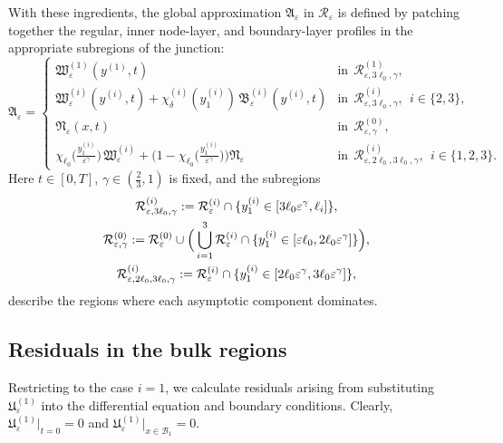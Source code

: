 \documentclass[reqno]{amsart}            %
\numberwithin{equation}{section}
\begin{document}
	With these ingredients, the global approximation $\mathfrak{A}_\varepsilon$ in $\mathcal{R}_\varepsilon$ is 
	defined by patching together the regular, inner node-layer, and boundary-layer profiles in the 
	appropriate subregions of the junction:
	\begin{equation}\label{first_app}
		\mathfrak{A}_\varepsilon =
		\left\{
		\begin{array}{ll}
			\mathfrak{W}^{(1)}_\varepsilon(y^{(1)}, t) & \text{in} \  \  \mathcal{R}^{(1)}_{\varepsilon,3\ell_0,\gamma}, 
			\\[4pt]
			\mathfrak{W}^{(i)}_\varepsilon(y^{(i)}, t) + \chi_\delta^{(i)}(y^{(i)}_1) \, \mathfrak{B}^{(i)}_\varepsilon(y^{(i)}, t)& \text{in} \ \
			\mathcal{R}^{(i)}_{\varepsilon,3\ell_0,\gamma}, \ \ i\in\{2, 3\},
			\\[4pt]
			\mathfrak{N}_\varepsilon(x,t) & \text{in} \ \  \mathcal{R}^{(0)}_{\varepsilon, \gamma},
			\\[4pt]
			\chi_{\ell_0}\big(\frac{y^{(i)}_1}{\varepsilon^\gamma}\big)\, \mathfrak{W}^{(i)}_\varepsilon +
			\Big(1- \chi_{\ell_0}\big(\frac{y^{(i)}_1}{\varepsilon^\gamma}\big)\Big) \mathfrak{N}_\varepsilon & \text{in} \ \
			\mathcal{R}^{(i)}_{\varepsilon,2\ell_0,3\ell_0,\gamma }, \ \ i\in\{1,2,3\}.
		\end{array}
		\right.
	\end{equation}
	Here $t\in[0,T]$, $\gamma\in(\tfrac23,1)$ is fixed, and the subregions
	\begin{gather}
		\mathcal{R}^{(i)}_{\varepsilon,3\ell_0,\gamma}
		:= \mathcal{R}^{(i)}_\varepsilon\cap\{y^{(i)}_1\in[3\ell_0\varepsilon^\gamma,\ell_i]\},
		\label{note_doms}\\
		\mathcal{R}^{(0)}_{\varepsilon,\gamma}
		:= \mathcal{R}^{(0)}_\varepsilon
		\cup\Big(\bigcup_{i=1}^3\mathcal{R}^{(i)}_\varepsilon
		\cap\{y^{(i)}_1\in[\varepsilon\ell_0,2\ell_0\varepsilon^\gamma]\}\Big),\notag\\
		\mathcal{R}^{(i)}_{\varepsilon,2\ell_0,3\ell_0,\gamma}
		:= \mathcal{R}^{(i)}_\varepsilon\cap\{y^{(i)}_1\in[2\ell_0\varepsilon^\gamma,3\ell_0\varepsilon^\gamma]\},
		\label{small-rec}
	\end{gather}
	describe the regions where each asymptotic component dominates.
	
	\subsection{Residuals in the bulk regions}	
	Restricting to the case $i=1$, we calculate residuals arising from substituting $\mathfrak{U}_\varepsilon^{(1)}$ into the differential equation and boundary conditions. Clearly, $\mathfrak{U}_\varepsilon^{(1)}\big|_{t=0}=0$ and $\mathfrak{U}_\varepsilon^{(1)}\big|_{x\in \mathcal{B}_1}=0.$ 
	
\end{document}
